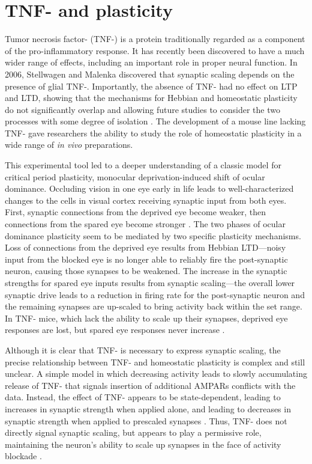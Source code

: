 \section{TNF-\textalpha{} and plasticity}

Tumor necrosis factor-\textalpha{} (TNF-\textalpha{}) is a protein traditionally regarded as a component of the pro-inflammatory response. It has recently been discovered to have a much wider range of effects, including an important role in proper neural function. In 2006, Stellwagen and Malenka discovered that synaptic scaling depends on the presence of glial TNF-\textalpha{}. Importantly, the absence of TNF-\textalpha{} had no effect on LTP and LTD, showing that the mechanisms for Hebbian and homeostatic plasticity do not significantly overlap and allowing future studies to consider the two processes with some degree of isolation \cite{Stellwagen2006}. The development of a mouse line lacking TNF-\textalpha{} gave researchers the ability to study the role of homeostatic plasticity in a wide range of \textit{in vivo} preparations.

This experimental tool led to a deeper understanding of a classic model for critical period plasticity, monocular deprivation-induced shift of ocular dominance. Occluding vision in one eye early in life leads to well-characterized changes to the cells in visual cortex receiving synaptic input from both eyes. First, synaptic connections from the deprived eye become weaker, then connections from the spared eye become stronger \cite{Frenkel2004}. The two phases of ocular dominance plasticity seem to be mediated by two specific plasticity mechanisms. Loss of connections from the deprived eye results from Hebbian LTD---noisy input from the blocked eye is no longer able to reliably fire the post-synaptic neuron, causing those synapses to be weakened. The increase in the synaptic strengths for spared eye inputs results from synaptic scaling---the overall lower synaptic drive leads to a reduction in firing rate for the post-synaptic neuron and the remaining synapses are up-scaled to bring activity back within the set range. In TNF-\textalpha{} mice, which lack the ability to scale up their synapses, deprived eye responses are lost, but spared eye responses never increase \cite{Kaneko2008}.

Although it is clear that TNF-\textalpha{} is necessary to express synaptic scaling, the precise relationship between TNF-\textalpha{} and homeostatic plasticity is complex and still unclear. A simple model in which decreasing activity leads to slowly accumulating release of TNF-\textalpha{} that signals insertion of additional AMPARs conflicts with the data. Instead, the effect of TNF-\textalpha{} appears to be state-dependent, leading to increases in synaptic strength when applied alone, and leading to decreases in synaptic strength when applied to prescaled synapses \cite{Steinmetz2010}. Thus, TNF-\textalpha{} does not directly signal synaptic scaling, but appears to play a permissive role, maintaining the neuron's ability to scale up synapses in the face of activity blockade \cite{Steinmetz2010}.

